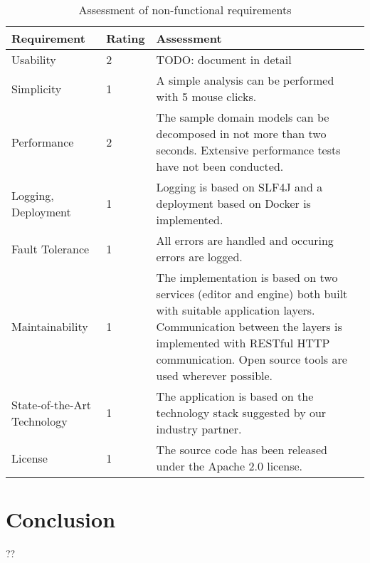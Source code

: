 \begin{table}[H]
	\centering
	\caption{Assessment of non-functional requirements}
	\label{tab:conclusionNonFunctional}
	\begin{tabular}{|p{100pt}|l|p{250pt}|}
	\hline \textbf{Requirement} & \textbf{Rating} & \textbf{Assessment} \\ 
	\hline Usability & 2 & TODO: document in detail \\ %
	\hline Simplicity & 1 & A simple analysis can be performed with 5 mouse clicks. \\
	\hline Performance & 2 & The sample domain models can be decomposed in not more than two seconds. Extensive performance tests have not been conducted. \\ %
	\hline Logging, \newline Deployment & 1 & Logging is based on SLF4J and a deployment based on Docker is implemented. \\
	\hline Fault Tolerance & 1 & All errors are handled and occuring errors are logged. \\
	\hline Maintainability & 1 & The implementation is based on two services (editor and engine) both built with suitable application layers. Communication between the layers is implemented with RESTful HTTP communication. Open source tools are used wherever possible. \\
	\hline State-of-the-Art Technology & 1 & The application is based on the technology stack suggested by our industry partner. \\
	\hline License & 1 & The source code has been released under the Apache 2.0 license. \\
	\hline 
	\end{tabular} 
\end{table}


\chapter{Conclusion}

??